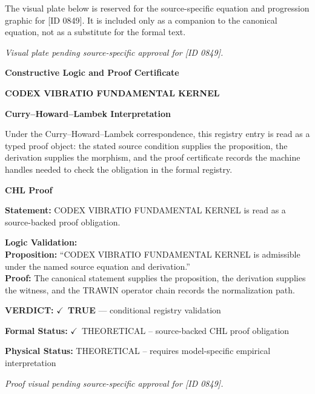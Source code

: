 \begingroup\footnotesize\sloppy
The visual plate below is reserved for the source-specific equation and progression graphic for [ID 0849]. It is included only as a companion to the canonical equation, not as a substitute for the formal text.
\par\endgroup
\begingroup\footnotesize\itshape
Visual plate pending source-specific approval for [ID 0849].
\par\endgroup

\clearpage
\begingroup\tzpsupportsetup
\noindent\textbf{\fontsize{10.8pt}{12.8pt}\selectfont [ID 0849] Constructive Logic and Proof Certificate}\par
\noindent\textbf{\fontsize{10pt}{12pt}\selectfont CODEX VIBRATIO FUNDAMENTAL KERNEL}\par
\vspace{0.45em}
\begingroup
\footnotesize
\setlength{\parskip}{0.22em}
\setlength{\parindent}{0pt}
\noindent\textbf{Curry--Howard--Lambek Interpretation}\par
Under the Curry--Howard--Lambek correspondence, this registry entry is read as a typed proof
object: the stated source condition supplies the proposition, the derivation supplies the
morphism, and the proof certificate records the machine handles needed to check the obligation
in the formal registry.

\vspace{0.45em}
\noindent\textbf{CHL Proof}\par
\textbf{Statement:} CODEX VIBRATIO FUNDAMENTAL KERNEL is read as a source-backed proof obligation.

\textbf{Logic Validation:}\\
\textbf{Proposition:} ``CODEX VIBRATIO FUNDAMENTAL KERNEL is admissible under the named source equation and derivation.''\\
\textbf{Proof:} The canonical statement supplies the proposition, the derivation supplies the witness, and the TRAWIN operator chain records the normalization path.

\textbf{VERDICT:} \ensuremath{\checkmark}\ \textbf{TRUE} --- conditional registry validation

\textbf{Formal Status:} \ensuremath{\checkmark}\ THEORETICAL -- source-backed CHL proof obligation

\textbf{Physical Status:} THEORETICAL -- requires model-specific empirical interpretation
\par\vspace{0.45em}
\par
\vfill
\begingroup\footnotesize\itshape
Proof visual pending source-specific approval for [ID 0849].
\par\endgroup
\vfill
\endgroup
\endgroup

